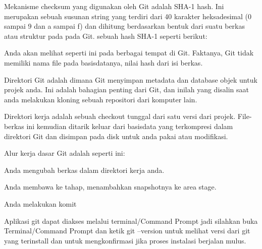 \vspace{\baselineskip}
\noindent 
 \hspace*{0.5in} Mekanisme checksum yang digunakan oleh Git adalah SHA-1 hash. Ini merupakan sebuah susunan string yang terdiri dari 40 karakter heksadesimal (0 sampai 9 dan a sampai f) dan dihitung berdasarkan bentuk dari suatu berkas atau struktur pada pada Git. sebuah hash SHA-1 seperti berikut: \par
 \vspace{\baselineskip}
\noindent 
Anda akan melihat seperti ini pada berbagai tempat di Git. Faktanya, Git tidak memiliki nama file pada basisdatanya, nilai hash dari isi berkas. \par
\vspace{\baselineskip}
\noindent 
Direktori Git adalah dimana Git menyimpan metadata dan database objek untuk projek anda. Ini adalah bahagian penting dari Git, dan inilah yang disalin saat anda melakukan kloning sebuah repositori dari komputer lain. \par
\vspace{\baselineskip}
\noindent 
Direktori kerja adalah sebuah checkout tunggal dari satu versi dari projek. File-berkas ini kemudian ditarik keluar dari basisdata yang terkompresi dalam direktori Git dan disimpan pada disk untuk anda pakai atau modifikasi. \par
\vspace{\baselineskip}
\noindent 
 \hspace*{0.5in} Alur kerja dasar Git adalah seperti ini: \par
\noindent 
 \hspace*{0.5in} Anda mengubah berkas dalam direktori kerja anda. \par
\noindent 
 \hspace*{0.5in} Anda membawa ke tahap, menambahkan snapshotnya ke area stage. \par
\noindent 
 \hspace*{0.5in} Anda melakukan komit \par
 \vspace{\baselineskip}
\noindent 
 \hspace*{0.5in} Aplikasi git dapat diakses melalui terminal/Command Prompt jadi silahkan buka Terminal/Command Prompt dan ketik $  $git --version $  $untuk melihat versi dari git yang terinstall dan untuk mengkonfirmasi jika proses instalasi berjalan mulus.  \par
 \vspace{\baselineskip}
 \vspace{\baselineskip}
